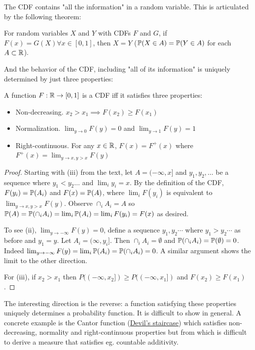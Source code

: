 \documentclass[10pt]{article}
\begin{document}
The CDF contains "all the information" in a random variable. This is
articulated by the following theorem:

\begin{theorem}
    For random variables $X$ and $Y$ with CDFs $F$ and $G$, if $F(x) = G(X)
    \forall x \in [0, 1]$, then $X = Y$ ($\P(X \in A) = \P(Y \in A)$ for each
    $A \subset \R$).
\end{theorem}

And the behavior of the CDF, including "all of its information" is uniquely
determined by just three properties:

\begin{theorem}
    A function $F: \R \to [0, 1]$ is a CDF iff it satisfies three properties:
    \begin{itemize}
        \item{Non-decreasing. $x_2 > x_1 \implies F(x_2) \geq F(x_1)$}
        \item{Normalization. $\lim_{y\to 0}F(y) = 0$ and $\lim_{y\to 1}F(y) = 1$}
        \item{Right-continuous. For any $x \in \R$, $F(x) = F^+(x)$ where
            $F^+(x) = \lim_{y \to x, y>x}F(y)$}
    \end{itemize}
\end{theorem}

\begin{proof}
    Starting with (iii) from the text, let $A = (-\infty, x]$ and $y_1, y_2, \dots$ be a sequence where
        $y_1 < y_2 \dots$ and $\lim_i y_i = x$. By the definition of the
        CDF, $F(y_i) = \P(A_i)$ and $F(x) = \P(A)$, where $\lim_i F(y_i)$ is equivalent to
        $\lim_{y\to x, y>x}F(y)$. Observe $\cap_i A_i = A$ so $\P(A) =
        \P(\cap_i A_i) = \lim_i \P(A_i) = \lim_i F(y_i) = F(x)$ as desired.

        To see (ii), $\lim_{y\to -\infty}F(y) = 0$, define a sequence $y_1, y_2
        \cdots$ where $y_1 > y_2 \cdots$ as before and $y_1 = y$. Let $A_i = (\infty, y_i]$.
        Then $\cap_i A_i = \emptyset$ and $\P(\cap_i A_i) = \P(\emptyset) = 0$.
        Indeed $\lim_{y \to -\infty}F(y) = \lim_{i}\P(A_i) = \P(\cap_i A_i) =
        0$. A similar argument shows the limit to the other direction.

        For (iii), if $x_2 > x_1$ then $P((-\infty, x_2]) \geq P((-\infty,
        x_1])$ and $F(x_2) \geq F(x_1)$.
\end{proof}

The interesting direction is the reverse: a function satisfying these
properties uniquely determines a probability function. It is difficult to show
in general. A concrete example is the Cantor function
(\href{https://en.wikipedia.org/wiki/Cantor_function}{Devil's staircase}) which
satisfies non-decreasing, normality and right-continuous properties but from
which is difficult to derive a measure that satisfies eg. countable additivity.
\end{document}
